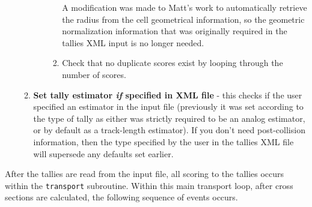 \documentclass[10pt]{article}
\newcounter{subsubsubsection}[subsubsection]
\numberwithin{equation}{section} %
\begin{document}
\begin{enumerate}
\begin{enumerate}
\begin{enumerate}
\begin{enumerate}
A modification was made to Matt's work to automatically retrieve the radius from the cell geometrical information, so the geometric normalization information that was originally required in the tallies XML input is no longer needed.
		
			\item Check that no duplicate scores exist by looping through the number of scores.
			\end{enumerate}
		\end{enumerate}
	\item {\bf Set tally estimator {\it if} specified in XML file} - this checks if the user specified an estimator in the input file (previously it was set according to the type of tally as either was strictly required to be an analog estimator, or by default as a track-length estimator).  If you don't need post-collision information, then the type specified by the user in the tallies XML file will supersede any defaults set earlier. 
	\end{enumerate}
\end{enumerate}


After the tallies are read from the input file, all scoring to the tallies occurs within the {\tt transport} subroutine. Within this main transport loop, after cross sections are calculated, the following sequence of events occurs.
\end{document}
